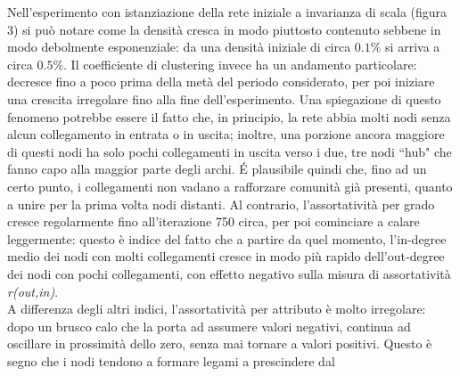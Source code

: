 \documentclass[a4paper,12pt]{article}
\begin{document}
Nell'esperimento con istanziazione della rete iniziale a invarianza di scala (figura 3) si può notare come la densità cresca in modo piuttosto contenuto sebbene in modo debolmente esponenziale: da una densità iniziale di circa $0.1\%$ si arriva a circa $0.5\%$. Il coefficiente di clustering invece ha un andamento particolare: decresce fino a poco prima della metà del periodo considerato, per poi iniziare una crescita irregolare fino alla fine dell'esperimento. Una spiegazione di questo fenomeno potrebbe essere il fatto che, in principio, la rete abbia molti nodi senza alcun collegamento in entrata o in uscita; inoltre, una porzione ancora maggiore di questi nodi ha solo pochi collegamenti in uscita verso i due, tre nodi ``hub" che fanno capo alla maggior parte degli archi. \'E plausibile quindi che, fino ad un certo punto, i collegamenti non vadano a rafforzare comunità già presenti, quanto a unire per la prima volta nodi distanti.
Al contrario, l'assortatività per grado cresce regolarmente fino all'iterazione 750 circa, per poi cominciare a calare leggermente: questo è indice del fatto che a partire da quel momento, l'in-degree medio dei nodi con molti collegamenti cresce in modo più rapido dell'out-degree dei nodi con pochi collegamenti, con effetto negativo sulla misura di assortatività \textit{r(out,in)}. \\
A differenza degli altri indici, l'assortatività per attributo è molto irregolare: dopo un brusco calo che la porta ad assumere valori negativi, continua ad oscillare in prossimità dello zero, senza mai tornare a valori positivi. Questo è segno che i nodi tendono a formare legami a prescindere dal 
\end{document}
